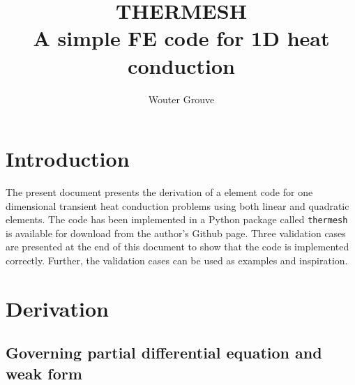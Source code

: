 \documentclass[10pt, a4paper, twoside, headinclude,footinclude, BCOR5mm]{scrartcl}
\author{Wouter Grouve}
\date{}
\title{THERMESH\\\medskip
\large A simple FE code for 1D heat conduction}
\begin{document}
\maketitle


\section{Introduction}
\label{sec:org5e87da7}

The present document presents the derivation of a element code for one dimensional transient heat conduction problems using both linear and quadratic elements. The code has been implemented in a Python package called \texttt{thermesh} is available for download from the author's Github page. Three validation cases are presented at the end of this document to show that the code is implemented correctly. Further, the validation cases can be used as examples and inspiration.

\section{Derivation}
\label{sec:org7b8095b}

\subsection{Governing partial differential equation and weak form}
\label{sec:org48b3671}
\end{document}
